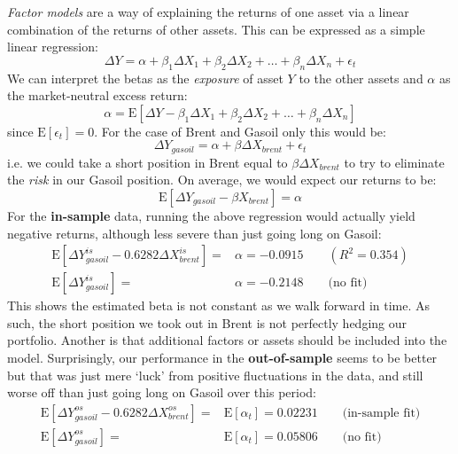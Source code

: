 \documentclass[11pt]{article}
\begin{document}
    {\em Factor models} are a way of explaining the returns of one asset via
a linear combination of the returns of other assets. This can be
expressed as a simple linear regression:
\begin{equation}\Delta Y = \alpha + \beta_1 \Delta X_1 + \beta_2 \Delta X_2 + \dots + \beta_n \Delta X_n + \epsilon_t \end{equation}
We can interpret the betas as the \emph{exposure} of asset \(Y\) to the
other assets and \(\alpha\) as the market-neutral excess return:
\begin{equation} \alpha = \mathrm{E}[\Delta Y - \beta_1 \Delta X_1 + \beta_2 \Delta X_2 + \dots + \beta_n \Delta X_n] \end{equation}
since \(\mathrm{E}[\epsilon_t] =0\).
For the case of Brent and Gasoil only this would be:
\begin{equation}\Delta Y_{gasoil} = \alpha + \beta \Delta X_{brent} + \epsilon_t \end{equation}
i.e. we could take a short position in Brent equal to
\(\beta \Delta X_{brent}\) to try to eliminate the \emph{risk} in our
Gasoil position. On average, we would expect our returns to be:
\begin{equation}\mathrm{E} [\Delta Y_{gasoil} - \beta X_{brent}] = \alpha \end{equation}
For the \textbf{in-sample} data, running the above regression would
actually yield negative returns, although less severe than just going
long on Gasoil:
\begin{equation}
\begin{array}{rl}
\mathrm{E} [ \Delta Y_{gasoil}^{is}  -0.6282 \Delta X_{brent}^{is}] =  & \alpha   =  -0.0915 \qquad (R^2 = 0.354) \\
\mathrm{E} [ \Delta Y_{gasoil}^{is}]  =  & \alpha   =   
-0.2148  \qquad  \text{(no fit)}
\end{array}
\end{equation}
This shows the estimated beta is not constant as we walk
forward in time. As such, the short position we took out in Brent is not
perfectly hedging our portfolio. Another is that additional factors or
assets should be included into the model.
Surprisingly, our performance in the \textbf{out-of-sample} seems to be
better but that was just mere `luck' from positive fluctuations in the
data, and still worse off than just going long on Gasoil over this period:
\begin{equation}
\begin{array}{rl}
\mathrm{E} [ \Delta Y_{gasoil}^{os}  -0.6282 \Delta X_{brent}^{os}] =  & \mathrm{E}[ \alpha_t]    = 0.02231 \qquad \text{(in-sample fit)}  \\
\mathrm{E} [ \Delta Y_{gasoil}^{os}] =   & \mathrm{E}[ \alpha_t]   =  0.05806  \qquad  \text{(no fit)}
\end{array}
\end{equation}
\end{document}

